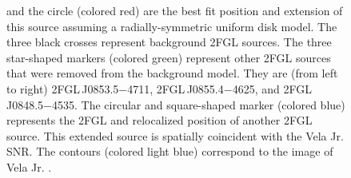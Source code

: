 \begin{figure}
{  and the circle (colored red) are the best fit position and extension of
  this source assuming a radially-symmetric uniform disk model.
  The three black crosses represent background 2FGL sources.
  The three star-shaped markers (colored green) represent other 2FGL sources
  that were removed from the background model.
  They are (from left to right) 2FGL\,J0853.5$-$4711, 2FGL\,J0855.4$-$4625, and 
  2FGL\,J0848.5$-$4535.
  The circular and square-shaped
  marker (colored blue) represents the 2FGL and relocalized position of another 2FGL source.  
  This extended source is spatially
  coincident with the Vela Jr. SNR.  The contours (colored light blue)
  correspond to the \tev image of Vela Jr.
  \citep{aharonian_2007a_h.e.s.s.-observations}.
  }
\end{figure}

